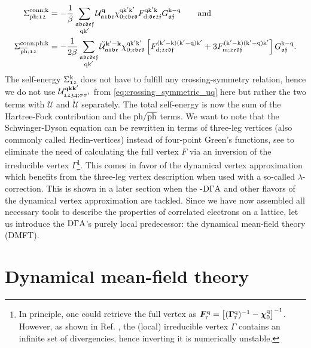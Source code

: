\documentclass[../../main.tex]{subfiles}
\begin{document}
\begin{subequations}
\begin{align}
	\Sigma^{\text{conn};\text{k}}_{\text{ph};\mathfrak{12}}&=-\frac1\beta\sum_{\substack{\mathfrak{abcdef}\\\text{q}\text{k}'}}\mathcal{U}^{\textbf{q}}_{\mathfrak{a1bc}}\chi^{\text{q}\text{k}'\text{k}'}_{0;\mathfrak{cbed}}F^{\text{q}\text{k}'\text{k}}_{\text{d};\mathfrak{de2f}}G_{\mathfrak{af}}^{\text{k}-\text{q}}\qquad\text{and}\\
	\Sigma^{\text{conn};\text{ph};\text{k}}_{\overline{\text{ph}};\mathfrak{12}}&=-\frac{1}{2\beta}\sum_{\substack{\mathfrak{abcdef}\\\text{q}\text{k}'}}\tilde{\mathcal{U}}^{\textbf{k}'-\textbf{k}}_{\mathfrak{a1bc}}\chi^{\text{q}\text{k}'\text{k}'}_{0;\mathfrak{cbed}}\left [F^{(\text{k}'-\text{k})(\text{k}'-\text{q})\text{k}'}_{\text{d};\mathfrak{2edf}}+3 F^{(\text{k}'-\text{k})(\text{k}'-\text{q})\text{k}'}_{\text{m};\mathfrak{2edf}}\right ]G_{\mathfrak{af}}^{\text{k}-\text{q}}.
\end{align}
\end{subequations}
The self-energy $\Sigma^{\text{k}}_{\mathfrak{12}}$ does not have to fulfill any crossing-symmetry relation, hence we do not use $\mathcal{U}^{\textbf{qkk}'}_{\mathfrak{1234};\sigma\sigma'}$ from \eqref{eq:crossing_symmetric_uq} here but rather the two terms with $\mathcal{U}$ and $\tilde{\mathcal{U}}$ separately. The total self-energy is now the sum of the Hartree-Fock contribution and the $\text{ph}/\overline{\text{ph}}$ terms. We want to note that the Schwinger-Dyson equation can be rewritten in terms of three-leg vertices (also commonly called Hedin-vertices) instead of four-point Green's functions, see \cite{hedin, krien boson exchange} to eliminate the need of calculating the full vertex $F$ via an inversion of the irreducible vertex $\Gamma$\footnote{In principle, one could retrieve the full vertex as $\bm F_{\text{r}}^{\text{q}}=\left [(\bm\Gamma_{\text{r}}^{\text{q}})^{-1}-\bm\chi_{0}^{\text{q}}\right ]^{-1}$. However, as shown in Ref. \cite{schäfer nonperturbative}, the (local) irreducible vertex $\Gamma$ contains an infinite set of divergencies, hence inverting it is numerically unstable.}. This comes in favor of the dynamical vertex approximation which benefits from the three-leg vertex description when used with a so-called $\lambda$-correction. This is shown in a later section when the -$\text{D}\Gamma\text{A}$ and other flavors of the dynamical vertex approximation are tackled. Since we have now assembled all necessary tools to describe the properties of correlated electrons on a lattice, let us introduce the $\text{D}\Gamma\text{A}$'s purely local predecessor: the dynamical mean-field theory (DMFT).

\section{Dynamical mean-field theory}\label{sec:dmft}
\end{document}
